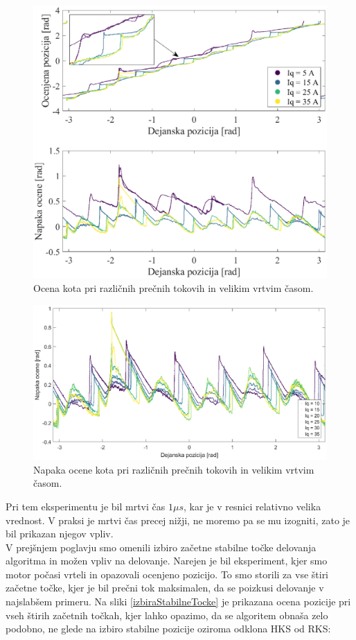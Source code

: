 \documentclass[a4paper,twoside,openright,12pt,slovene]{book}
\begin{document}
\begin{figure}[!htbp]
    \centering
    \includegraphics[width=0.9\columnwidth]{Slike/vsiljenaPozicijaTokoviZMrtvimCasom_angle.eps}
    \caption{\label{vsiljenaPozicijaTokoviZMrtvimCasom_angle} Ocena kota pri različnih prečnih tokovih in velikim vrtvim časom. }
\end{figure}

\begin{figure}[!htbp]
    \centering
    \includegraphics[width=1.05\columnwidth]{Slike/vsiljenaPozicijaTokoviZMrtvimCasom_angleError.eps}
    \caption{\label{vsiljenaPozicijaTokoviZMrtvimCasom_angleError} Napaka ocene kota pri različnih prečnih tokovih in velikim vrtvim časom. }
\end{figure}

Pri tem eksperimentu je bil mrtvi čas $1 \mu s$, kar je v resnici relativno velika vrednost. V praksi je mrtvi čas precej nižji, ne moremo pa se mu izogniti, zato je bil prikazan njegov vpliv.
\\
V prejšnjem poglavju smo omenili izbiro začetne stabilne točke delovanja algoritma in možen vpliv na delovanje. Narejen je bil eksperiment, kjer smo motor počasi vrteli in opazovali ocenjeno pozicijo.
To smo storili za vse štiri začetne točke, kjer je bil prečni tok maksimalen, da se poizkusi delovanje v najslabšem primeru. Na sliki \ref{izbiraStabilneTocke} je prikazana ocena pozicije pri vseh
štirih začetnih točkah, kjer lahko opazimo, da se algoritem obnaša zelo podobno, ne glede na izbiro stabilne pozicije oziroma odklona HKS od RKS:
\end{document}
